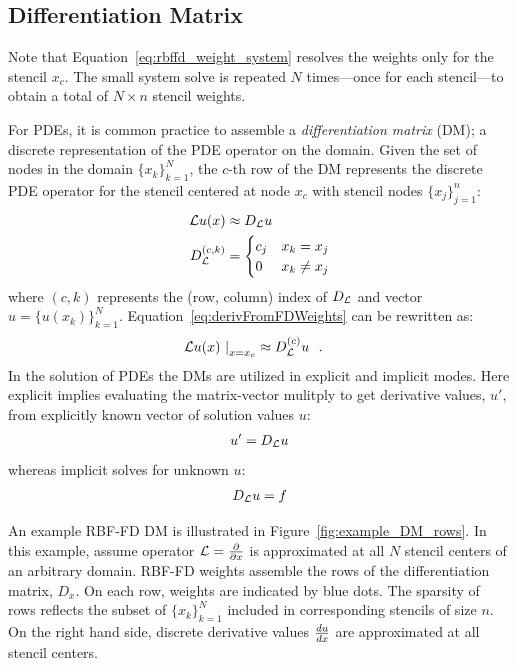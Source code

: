 \documentclass[11pt]{report}
\begin{document}
{\subsection{Differentiation Matrix}
Note that Equation~\ref{eq:rbffd_weight_system} resolves the weights only for the stencil $x_c$. The small system solve is repeated $N$ times---once for each stencil---to obtain a total of $N \times n$ stencil weights. 

For PDEs, it is common practice to assemble a \emph{differentiation matrix} (DM); a discrete representation of the PDE operator on the domain. Given the set of nodes in the domain $\{x_k\}_{k=1}^N$, the $c$-th row of the DM represents the discrete PDE operator for the stencil centered at node $x_c$ with stencil nodes $\{x_j\}_{j=1}^{n}$: 
\begin{align*}
 \mathcal{L}u(x) & \approx D_{\mathcal{L}} u \\
D_{\mathcal{L}}^{(c,k)} & = \begin{cases} c_j & x_k = x_j \\
                                    0 & x_k \neq x_j \\
                                    \end{cases} 
\end{align*}
where $(c,k)$ represents the (row, column) index of $D_{\mathcal{L}}$ and vector $u = \{u(x_k)\}_{k=1}^{N}$. Equation~\ref{eq:derivFromFDWeights} can be rewritten as:
\begin{align*}
\left. \mathcal{L}u(x) \ \right|_{x = x_c} & \approx D_{\mathcal{L}}^{(c)} u \ \ .
\end{align*}
In the solution of PDEs the DMs are utilized in explicit and implicit modes. Here explicit implies evaluating the matrix-vector mulitply to get derivative values, $u'$, from explicitly known vector of solution values $u$: 
\begin{align*}
u' = D_{\mathcal{L}} u
\end{align*}
whereas implicit solves for unknown $u$:
\begin{align*}
D_{\mathcal{L}} u = f
\end{align*}

An example RBF-FD DM is illustrated in Figure~\ref{fig:example_DM_rows}. In this example, assume operator $\mathcal{L} = \frac{\partial }{\partial x}$ is approximated at all $N$ stencil centers of an arbitrary domain. RBF-FD weights assemble the rows of the differentiation matrix, $D_{x}$. On each row, weights are indicated by blue dots. The sparsity of rows reflects the subset of $\{x_k\}_{k=1}^N$ included in corresponding stencils of size $n$. On the right hand side, discrete derivative values $\frac{d u}{d x}$ are approximated at all stencil centers. 

}
\end{document}
